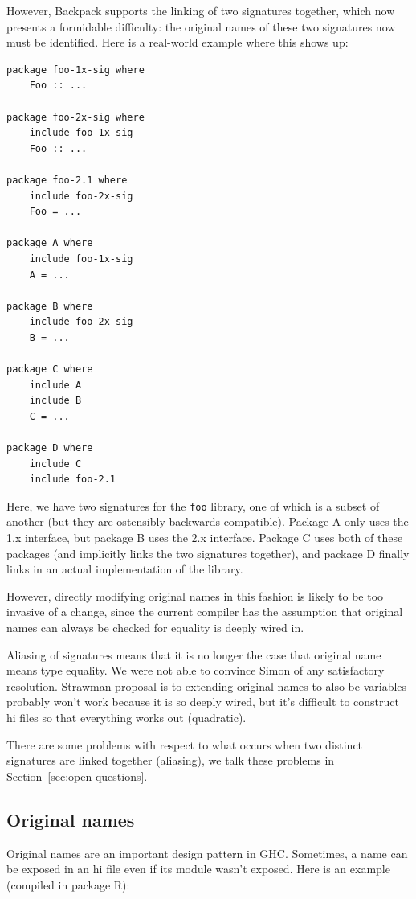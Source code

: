 \documentclass{article}
\begin{document}
However, Backpack supports the linking of two signatures together, which
now presents a formidable difficulty: the original names of these two
signatures now must be identified.  Here is a real-world example where
this shows up:

\begin{verbatim}
package foo-1x-sig where
    Foo :: ...

package foo-2x-sig where
    include foo-1x-sig
    Foo :: ...

package foo-2.1 where
    include foo-2x-sig
    Foo = ...

package A where
    include foo-1x-sig
    A = ...

package B where
    include foo-2x-sig
    B = ...

package C where
    include A
    include B
    C = ...

package D where
    include C
    include foo-2.1
\end{verbatim}

Here, we have two signatures for the \verb|foo| library, one of which
is a subset of another (but they are ostensibly backwards compatible).
Package A only uses the 1.x interface, but package B uses the 2.x interface.
Package C uses both of these packages (and implicitly links the two signatures
together), and package D finally links in an actual implementation of the
library.



However, directly modifying original names in this fashion
is likely to be too invasive of a change, since the current compiler has
the assumption that original names can always be checked for equality
is deeply wired in.

Aliasing of signatures means that it is no longer the case that
original name means type equality.  We were not able to convince
Simon of any satisfactory resolution.  Strawman proposal is to
extending original names to also be variables probably won't work
because it is so deeply wired, but it's difficult to construct hi
files so that everything works out (quadratic).


There are some problems with respect to what occurs when two
distinct signatures are linked together (aliasing), we talk these problems in
Section~\ref{sec:open-questions}.

\fi

\subsection{Original names} Original names are an important design pattern
in GHC\@.
Sometimes, a name can be exposed in an hi file even if its module
wasn't exposed. Here is an example (compiled in package R):
\end{document}
